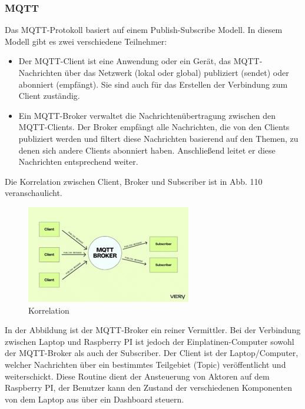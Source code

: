 \subsubsection{MQTT}
Das MQTT-Protokoll\autocite{mqtt} basiert auf einem Publish-Subscribe Modell. In diesem Modell gibt es zwei verschiedene Teilnehmer:
\begin{itemize}
    \item Der MQTT-Client ist eine Anwendung oder ein Gerät, das MQTT-Nachrichten über das Netzwerk (lokal oder global) publiziert (sendet) oder abonniert (empfängt). Sie sind auch für das Erstellen der Verbindung zum Client zuständig.
    \item Ein MQTT-Broker verwaltet die Nachrichtenübertragung zwischen den MQTT-Clients. Der Broker empfängt alle Nachrichten, die von den Clients publiziert werden und filtert diese Nachrichten basierend auf den Themen, zu denen sich andere Clients abonniert haben. Anschließend leitet er diese Nachrichten entsprechend weiter. 
\end{itemize}
Die Korrelation zwischen Client, Broker und Subscriber ist in Abb. 110 veranschaulicht. 
\vspace{3mm}
\begin{figure}[H]
    \centering
    \includegraphics[scale=1]{image/korreation.png}
    \caption{Korrelation\autocite{mqtt-architecture}}
    \label{fig:enter-label}
\end{figure}
\vspace{3mm}
In der Abbildung ist der MQTT-Broker ein reiner Vermittler. Bei der Verbindung zwischen Laptop und Raspberry PI ist jedoch der Einplatinen-Computer sowohl der MQTT-Broker als auch der Subscriber. Der Client ist der Laptop/Computer, welcher Nachrichten über ein bestimmtes Teilgebiet (Topic) veröffentlicht und weiterschickt. Diese Routine dient der Ansteuerung von Aktoren auf dem Raspberry PI, der Benutzer kann den Zustand der verschiedenen Komponenten von dem Laptop aus über ein Dashboard steuern. 

